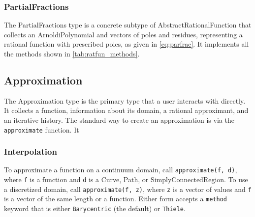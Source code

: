 \documentclass{juliacon}
\begin{document}
\subsubsection{PartialFractions}

The PartialFractions type is a concrete subtype of AbstractRationalFunction that collects an ArnoldiPolynomial and vectors of poles and residues, representing a rational function with prescribed poles, as given in \autoref{eq:parfrac}. It implements all the methods shown in \autoref{tab:ratfun_methods}. 

\subsection{Approximation}
\label{sec:approximation}

The Approximation type is the primary type that a user interacts with directly. It collects a function, information about its domain, a rational approximant, and an iterative history. The standard way to create an approximation is via the \verb|approximate| function. It 

\subsubsection{Interpolation} To approximate a function on a continuum domain, call \texttt{approximate(f, d)}, where \verb|f| is a function and \verb|d| is a Curve, Path, or SimplyConnectedRegion. To use a discretized domain, call \texttt{approximate(f, z)}, where \verb|z| is a vector of values and \verb|f| is a vector of the same length or a function. Either form accepts a \texttt{method} keyword that is either \texttt{Barycentric} (the default) or \texttt{Thiele}. 

\end{document}
